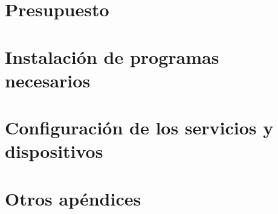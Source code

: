 \documentclass[spanish,a4paper,11pt,oneside]{extreport}
\begin{document}
\newpage{\pagestyle{empty}}
\thispagestyle{empty}

\chapter{\LARGE Presupuesto}
\label{chapter:presupuesto}


\newpage
\thispagestyle{empty}
\vspace*{\fill}
\begin{center}
\end{center}
\vspace*{\fill}
\newpage

\newpage{\pagestyle{empty}\cleardoublepage}
\thispagestyle{empty}

\begin{appendix}

	\chapter{\LARGE Instalación de programas necesarios}
	\label{appendix:1}
	

	\chapter{\LARGE Configuración de los servicios y dispositivos}
	\label{appendix:2}
	

	\chapter{\LARGE Otros apéndices}
	\label{appendix:3}
	


\end{appendix}


\nocite{*}



\end{document}
